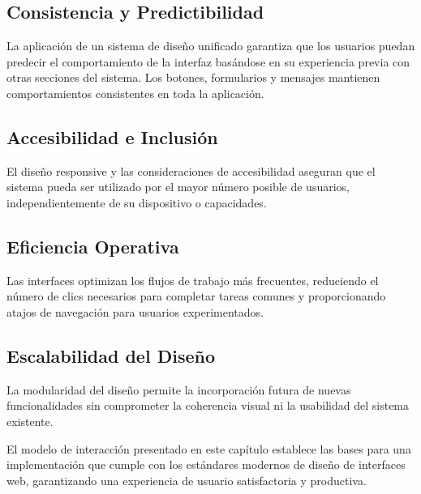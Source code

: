 \subsection{Consistencia y Predictibilidad}
La aplicación de un sistema de diseño unificado garantiza que los usuarios puedan predecir el comportamiento de la interfaz basándose en su experiencia previa con otras secciones del sistema. Los botones, formularios y mensajes mantienen comportamientos consistentes en toda la aplicación.

\subsection{Accesibilidad e Inclusión}
El diseño responsive y las consideraciones de accesibilidad aseguran que el sistema pueda ser utilizado por el mayor número posible de usuarios, independientemente de su dispositivo o capacidades.

\subsection{Eficiencia Operativa}
Las interfaces optimizan los flujos de trabajo más frecuentes, reduciendo el número de clics necesarios para completar tareas comunes y proporcionando atajos de navegación para usuarios experimentados.

\subsection{Escalabilidad del Diseño}
La modularidad del diseño permite la incorporación futura de nuevas funcionalidades sin comprometer la coherencia visual ni la usabilidad del sistema existente.

El modelo de interacción presentado en este capítulo establece las bases para una implementación que cumple con los estándares modernos de diseño de interfaces web, garantizando una experiencia de usuario satisfactoria y productiva.

